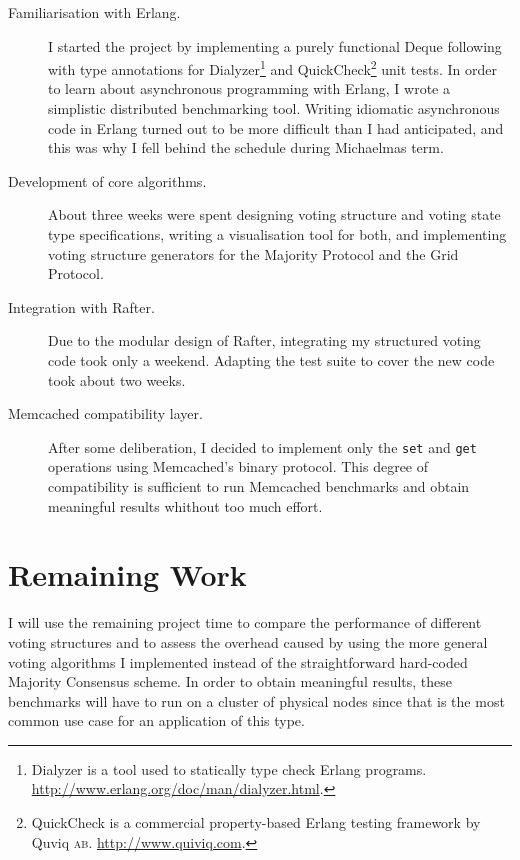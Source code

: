 \documentclass[11pt]{scrartcl}
\begin{document}
\begin{description}
    \item[Familiarisation with Erlang.] I started the project by implementing a purely functional Deque following \cite{okasaki} with type annotations for Dialyzer\footnote{Dialyzer is a tool used to statically type check Erlang programs. \url{http://www.erlang.org/doc/man/dialyzer.html}.} and QuickCheck\footnote{QuickCheck is a commercial property-based Erlang testing framework by Quviq \textsc{ab}. \url{http://www.quiviq.com}.} unit tests. In order to learn about asynchronous programming with Erlang, I wrote a simplistic distributed benchmarking tool. Writing idiomatic asynchronous code in Erlang turned out to be more difficult than I had anticipated, and this was why I fell behind the schedule during Michaelmas term.
    \item[Development of core algorithms.] About three weeks were spent designing voting structure and voting state type specifications, writing a visualisation tool for both, and implementing voting structure generators for the Majority Protocol and the Grid Protocol.
    \item[Integration with Rafter.] Due to the modular design of Rafter, integrating my structured voting code took only a weekend. Adapting the test suite to cover the new code took about two weeks.
    \item[Memcached compatibility layer.] After some deliberation, I decided to implement only the \texttt{set} and \texttt{get} operations using Memcached's binary protocol. This degree of compatibility is sufficient to run Memcached benchmarks and obtain meaningful results whithout too much effort.
\end{description}

\section{Remaining Work%
  \label{remaining-work}%
}

I will use the remaining project time to compare the performance of different voting structures and to assess the overhead caused by using the more general voting algorithms I implemented instead of the straightforward hard-coded Majority Consensus scheme. In order to obtain meaningful results, these benchmarks will have to run on a cluster of physical nodes since that is the most common use case for an application of this type.
\end{document}
